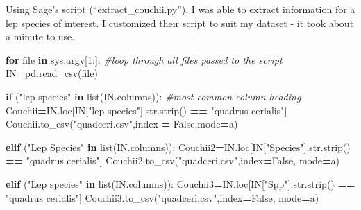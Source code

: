 \documentclass[
]{article}
\newenvironment{Shaded}{\begin{snugshade}}{\end{snugshade}}
\newcommand{\BuiltInTok}[1]{#1}
\newcommand{\CommentTok}[1]{\textcolor[rgb]{0.56,0.35,0.01}{\textit{#1}}}
\newcommand{\ControlFlowTok}[1]{\textcolor[rgb]{0.13,0.29,0.53}{\textbf{#1}}}
\newcommand{\DecValTok}[1]{\textcolor[rgb]{0.00,0.00,0.81}{#1}}
\newcommand{\KeywordTok}[1]{\textcolor[rgb]{0.13,0.29,0.53}{\textbf{#1}}}
\newcommand{\NormalTok}[1]{#1}
\newcommand{\OperatorTok}[1]{\textcolor[rgb]{0.81,0.36,0.00}{\textbf{#1}}}
\newcommand{\StringTok}[1]{\textcolor[rgb]{0.31,0.60,0.02}{#1}}
\newcommand{\VariableTok}[1]{\textcolor[rgb]{0.00,0.00,0.00}{#1}}
\begin{document}
Using Sage's script (``extract\_couchii.py''), I was able to extract
information for a lep species of interest. I customized their script to
suit my dataset - it took about a minute to use.

\begin{Shaded}
\begin{Highlighting}[]
\ControlFlowTok{for} \BuiltInTok{file} \KeywordTok{in}\NormalTok{ sys.argv[}\DecValTok{1}\NormalTok{:]:  }\CommentTok{\#loop through all files passed to the script}
\NormalTok{  IN}\OperatorTok{=}\NormalTok{pd.read\_csv(}\BuiltInTok{file}\NormalTok{)}
  
  \ControlFlowTok{if}\NormalTok{ (}\StringTok{"lep species"} \KeywordTok{in} \BuiltInTok{list}\NormalTok{(IN.columns)): }\CommentTok{\#most common column heading}
\NormalTok{      Couchii}\OperatorTok{=}\NormalTok{IN.loc[IN[}\StringTok{"lep species"}\NormalTok{].}\BuiltInTok{str}\NormalTok{.strip() }\OperatorTok{==} \StringTok{"quadrus cerialis"}\NormalTok{]}
\NormalTok{      Couchii.to\_csv(}\StringTok{"quadceri.csv"}\NormalTok{,index }\OperatorTok{=} \VariableTok{False}\NormalTok{,mode}\OperatorTok{=}\StringTok{\textquotesingle{}a\textquotesingle{}}\NormalTok{)}
  
  \ControlFlowTok{elif}\NormalTok{ (}\StringTok{"Lep Species"} \KeywordTok{in} \BuiltInTok{list}\NormalTok{(IN.columns)):}
\NormalTok{      Couchii2}\OperatorTok{=}\NormalTok{IN.loc[IN[}\StringTok{"Species"}\NormalTok{].}\BuiltInTok{str}\NormalTok{.strip() }\OperatorTok{==} \StringTok{"quadrus cerialis"}\NormalTok{]}
\NormalTok{      Couchii2.to\_csv(}\StringTok{"quadceri.csv"}\NormalTok{,index}\OperatorTok{=}\VariableTok{False}\NormalTok{, mode}\OperatorTok{=}\StringTok{\textquotesingle{}a\textquotesingle{}}\NormalTok{)}
  
  \ControlFlowTok{elif}\NormalTok{ (}\StringTok{"Lep species"} \KeywordTok{in} \BuiltInTok{list}\NormalTok{(IN.columns)):}
\NormalTok{      Couchii3}\OperatorTok{=}\NormalTok{IN.loc[IN[}\StringTok{"Spp"}\NormalTok{].}\BuiltInTok{str}\NormalTok{.strip() }\OperatorTok{==} \StringTok{"quadrus cerialis"}\NormalTok{]}
\NormalTok{      Couchii3.to\_csv(}\StringTok{"quadceri.csv"}\NormalTok{,index}\OperatorTok{=}\VariableTok{False}\NormalTok{, mode}\OperatorTok{=}\StringTok{\textquotesingle{}a\textquotesingle{}}\NormalTok{)}
\end{Highlighting}
\end{Shaded}
\end{document}
